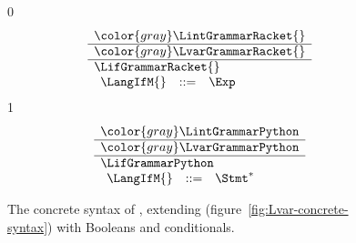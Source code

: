 \documentclass[7x10]{TimesAPriori_MIT}%
\newcommand{\gray}[1]{{\color{gray} #1}}
\def\racketEd{0}
\def\pythonEd{1}
\def\edition{1}
\newcommand{\pythonColor}[0]{}
\numberwithin{theorem}{chapter}
\numberwithin{definition}{chapter}
\numberwithin{equation}{chapter}
\begin{document}
\begin{figure}[tp]
\centering
\begin{tcolorbox}[colback=white]
{\if\edition\racketEd    
\[
\begin{array}{l}
  \gray{\LintGrammarRacket{}} \\ \hline
  \gray{\LvarGrammarRacket{}} \\ \hline
  \LifGrammarRacket{} \\ 
  \begin{array}{lcl}
    \LangIfM{} &::=& \Exp
  \end{array}
\end{array}
\]
\fi}
{\if\edition\pythonEd\pythonColor
\[
\begin{array}{l}
  \gray{\LintGrammarPython} \\ \hline
  \gray{\LvarGrammarPython}  \\ \hline
  \LifGrammarPython \\  
\begin{array}{rcl}
  \LangIfM{} &::=& \Stmt^{*}
\end{array}
\end{array}
\]
\fi}
\end{tcolorbox}
\caption{The concrete syntax of \LangIf{}, extending \LangVar{}
  (figure~\ref{fig:Lvar-concrete-syntax}) with Booleans and conditionals.}
\label{fig:Lif-concrete-syntax}
\end{figure}
\end{document}
